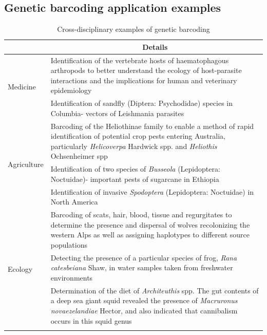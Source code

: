 \begin{landscape}

\section{Genetic barcoding application examples}

	\renewcommand{\arraystretch}{0.5} %
	\begin{longtable}{p{}p{}} 
		\caption{Cross-disciplinary examples of genetic barcoding} \label{tab:barcoding} \\	
		\toprule
		\multicolumn{1}{l}{\textbf{}} & \multicolumn{1}{c}{\textbf{Details}} \\ \midrule
		\multirow{2}{*}{Medicine} & Identification of the vertebrate hosts of haematophagous arthropods to better understand the ecology of host-parasite interactions and the implications for human and veterinary epidemiology \citep{Alcaide2009} \\ \cmidrule(l){2-2} 
		& Identification of sandfly (Diptera: Psychodidae) species in Columbia- vectors of Leishmania parasites \citep{Gutierrez2014} \\ \midrule
		\multirow{3}{*}{Agriculture} & Barcoding of the Heliothinae family to enable a method of rapid identification of potential crop pests entering Australia, particularly \textit{Helicoverpa} Hardwick spp. and \textit{Heliothis} Ochsenheimer spp \citep{Ball2006} \\ \cmidrule(l){2-2} 
		& Identification of two species of \textit{Busseola} (Lepidoptera: Noctuidae)- important pests of sugarcane in Ethiopia \citep{Assefa2007} \\ \cmidrule(l){2-2} 
		& Identification of invasive \textit{Spodoptera} (Lepidoptera: Noctuidae) in North America \citep{Nagoshi2011} \\ \midrule
		\multirow{4}{*}{Ecology} & Barcoding of scats, hair, blood, tissue and regurgitates to determine the presence and dispersal of wolves recolonizing the western Alps as well as assigning haplotypes to different source populations \citep{Valiere2003} \\ \cmidrule(l){2-2} 
		& Detecting the presence of a particular species of frog, \textit{Rana catesbeiana} Shaw, in water samples taken from freshwater environments \citep{Ficetola2008} \\ \cmidrule(l){2-2} 
		& Determination of the diet of \textit{Architeuthis} spp. The gut contents of a deep sea giant squid revealed the presence of \textit{Macruronus novaezelandiae} Hector, and also indicated that cannibalism occurs in this squid genus \citep{Deagle2005} \\ \cmidrule(l){2-2} 

\end{longtable}
\end{landscape}
